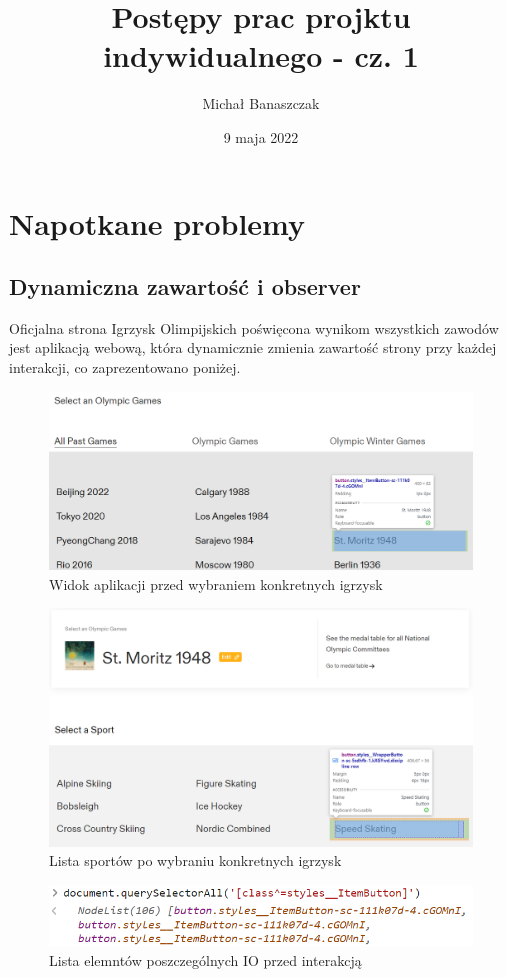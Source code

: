 \documentclass[a4paper,11pt]{article}
\title{Postępy prac projktu indywidualnego - cz. 1}
\author{Michał Banaszczak}
\date{9 maja 2022}
\begin{document}
\maketitle

\section{Napotkane problemy}
\subsection{Dynamiczna zawartość i observer}
Oficjalna strona Igrzysk Olimpijskich poświęcona wynikom wszystkich zawodów 
jest aplikacją webową, która dynamicznie zmienia zawartość strony przy każdej
interakcji, co zaprezentowano poniżej.

\begin{figure}[h!t]
    \centering
    \includegraphics[width=0.87\linewidth]{games-list.png}
    \caption{Widok aplikacji przed wybraniem konkretnych igrzysk}
\end{figure}

\begin{figure}[h!t]
    \centering
    \includegraphics[width=0.87\linewidth]{sport-list.png}
    \caption{Lista sportów po wybraniu konkretnych igrzysk}
\end{figure}

\begin{figure}[h!t]
    \centering
    \includegraphics[width=0.5\linewidth]{selector-on-games-list.png}
    \caption{Lista elemntów poszczególnych IO przed interakcją}
\end{figure}
\end{document}
